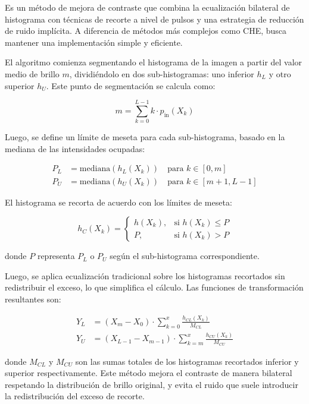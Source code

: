 \documentclass[sigchi]{acmart}
\begin{document}
Es un método de mejora de contraste que combina la ecualización bilateral de histograma
con técnicas de recorte a nivel de pulsos y una estrategia de reducción de ruido implícita. A
diferencia de métodos más complejos como CHE, busca mantener una implementación simple y
eficiente.

El algoritmo comienza segmentando el histograma de la imagen a partir del valor medio de brillo
\( m \), dividiéndolo en dos sub-histogramas: uno inferior \( h_L \) y otro superior \( h_U \).
Este punto de segmentación se calcula como:

\begin{equation}
	m = \sum_{k=0}^{L-1} k \cdot p_{\text{in}}(X_k)
\end{equation}

Luego, se define un límite de meseta para cada sub-histograma, basado en la mediana de las
intensidades ocupadas:

\begin{align}
	P_L & = \text{mediana}(h_L(X_k)) \quad \text{para } k \in [0, m]     \\
	P_U & = \text{mediana}(h_U(X_k)) \quad \text{para } k \in [m+1, L-1]
\end{align}

El histograma se recorta de acuerdo con los límites de meseta:

\begin{equation}
	h_{C}(X_k) =
	\begin{cases}
		h(X_k), & \text{si } h(X_k) \leq P \\
		P,      & \text{si } h(X_k) > P
	\end{cases}
\end{equation}

donde \( P \) representa \( P_L \) o \( P_U \) según el sub-histograma correspondiente.

Luego, se aplica ecualización tradicional sobre los histogramas recortados sin redistribuir el
exceso, lo que simplifica el cálculo. Las funciones de transformación resultantes son:

\begin{align}
	Y_L & = (X_m - X_0) \cdot \sum_{k=0}^{x} \frac{h_{CL}(X_k)}{M_{CL}}         \\
	Y_U & = (X_{L-1} - X_{m-1}) \cdot \sum_{k=m}^{x} \frac{h_{CU}(X_k)}{M_{CU}}
\end{align}

donde \( M_{CL} \) y \( M_{CU} \) son las sumas totales de los histogramas recortados inferior
y superior respectivamente. Este método mejora el contraste de manera bilateral respetando la
distribución de brillo original, y evita el ruido que suele introducir la redistribución del
exceso de recorte.
\end{document}

